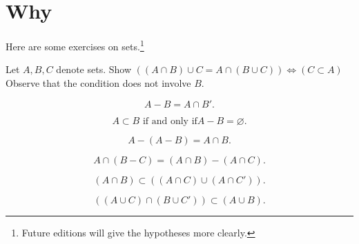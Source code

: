 
\section*{Why}

Here are some exercises on sets.\footnote{Future editions will give the hypotheses more clearly.}

\begin{exercise}
Let $A, B, C$ denote sets.
Show $((A \cap  B) \cup C = A \cap  (B \cup C)) \iff (C \subset A)$
Observe that the condition does not involve $B$.
\end{exercise}

\begin{exercise}
\[
A - B = A \cap  B'.
\]
\end{exercise}

\begin{exercise}
\[
A \subset B \text{ if and only if} A - B = \varnothing.
\]
\end{exercise}

\begin{exercise}
\[
A - (A - B) = A \cap  B.
\]
\end{exercise}

\begin{exercise}
\[
A \cap  (B - C) = (A \cap  B) - (A \cap  C).
\]
\end{exercise}

\begin{exercise}
\[
(A \cap  B) \subset ((A \cap  C) \cup (A \cap  C')).
\]
\end{exercise}

\begin{exercise}
\[
((A \cup C) \cap  (B \cup C')) \subset (A \cup B).
\]
\end{exercise}

\blankpage

